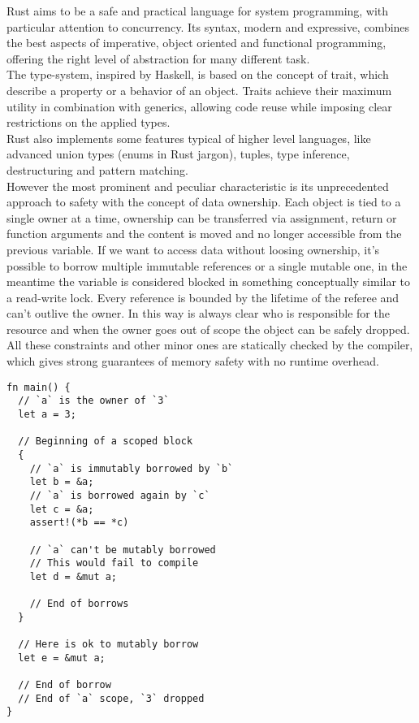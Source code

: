 Rust aims to be a safe and practical language for system programming, with particular attention to concurrency. Its syntax, modern and expressive, combines the best aspects of imperative, object oriented and functional programming, offering the right level of abstraction for many different task.\\
The type-system, inspired by Haskell, is based on the concept of trait, which describe a property or a behavior of an object. Traits achieve their maximum utility in combination with generics, allowing code reuse while imposing clear restrictions on the applied types.\\
Rust also implements some features typical of higher level languages, like advanced union types (enums in Rust jargon), tuples, type inference, destructuring and pattern matching.\\
However the most prominent and peculiar characteristic is its unprecedented approach to safety with the concept of data ownership. Each object is tied to a single owner at a time, ownership can be transferred via assignment, return or function arguments and the content is moved and no longer accessible from the previous variable. If we want to access data without loosing ownership, it's possible to borrow multiple immutable references or a single mutable one, in the meantime the variable is considered blocked in something conceptually similar to a read-write lock. Every reference is bounded by the lifetime of the referee and can't outlive the owner. In this way is always clear who is responsible for the resource and when the owner goes out of scope the object can be safely dropped.\\
All these constraints and other minor ones are statically checked by the compiler, which gives strong guarantees of memory safety with no runtime overhead.

\begin{minipage}{\textwidth}
\begin{lstlisting}[caption={Example of borrow},label={lst:borrow},xleftmargin=.2\textwidth]
fn main() {
  // `a` is the owner of `3`
  let a = 3;

  // Beginning of a scoped block
  {
    // `a` is immutably borrowed by `b`
    let b = &a;
    // `a` is borrowed again by `c`
    let c = &a;
    assert!(*b == *c)

    // `a` can't be mutably borrowed
    // This would fail to compile
    let d = &mut a;

    // End of borrows
  }

  // Here is ok to mutably borrow
  let e = &mut a;

  // End of borrow
  // End of `a` scope, `3` dropped
}
\end{lstlisting}
\end{minipage}\\

